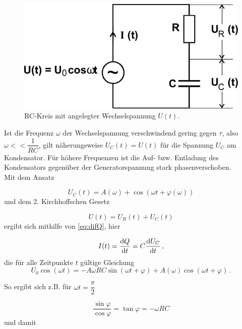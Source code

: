 \begin{figure}[H]
    \centering
    \includegraphics{figures/RC-Kreis Wechselspannung.pdf}
    \caption{RC-Kreis mit angelegter Wechselspannung $U(t)$\cite{ap08}.}
    \label{fig:sinspann}
\end{figure}

Ist die Frequenz $ω$ der Wechselspannung verschwindend gering gegen $τ$, also $ω << \dfrac{1}{RC}$, gilt näherungsweise $U_C(t) = U(t)$ für die Spannung $U_C$ am Kondensator.
Für höhere Frequenzen ist die Auf- bzw. Entladung des Kondensators gegenüber der Generatorspannung stark phasenverschoben. \\

Mit dem Ansatz

\begin{equation*}
    U_C(t) = A(ω) + \cos(ω t + \varphi(ω))
\end{equation*} und dem 2. Kirchhoffschen Gesetz

\begin{equation*}
    U(t) = U_R(t) + U_C(t)
\end{equation*} ergibt sich mithilfe von \eqref{eq:difQ}, hier

\begin{equation*}
    I(t) = \frac{\mathrm{d} Q}{\mathrm{d} t} = C \frac{\mathrm{d} U_C}{\mathrm{d} t} \,,
    \label{eq:It}
\end{equation*}
die für alle Zeitpunkte $t$ gültige Gleichung
\begin{equation}
    U_0 \cos(\omega t) = - A \omega R C  \sin(\omega t + \varphi) + A(\omega) \cos(\omega t + \varphi) \,.
    \label{eq:U_0omegagedöns}
\end{equation}

So ergibt sich z.B. für $\omega t = \dfrac{\pi}{2}$

\begin{equation*}
    \frac{\sin\varphi}{\cos\varphi} = \tan\varphi = -ω R C
\end{equation*} und damit 

